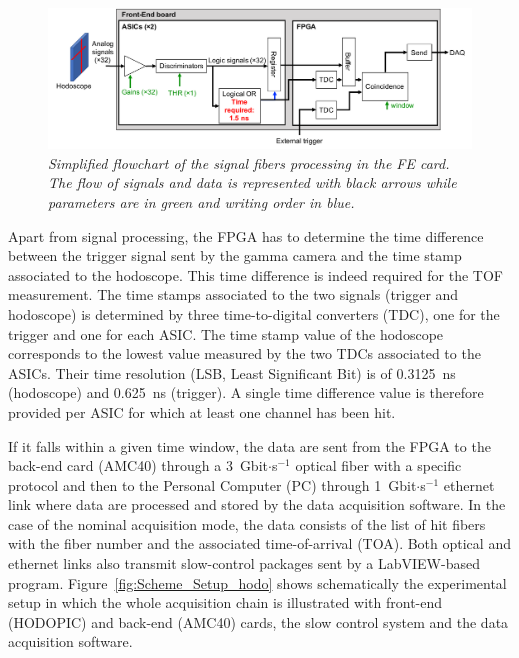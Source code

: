 \documentclass[a4paper,11pt]{article}
\begin{document}
\begin{figure}[htb]
\centering
\includegraphics[width=\textwidth]{figures/Hodoscope_reading_scheme.pdf}
\caption{\small{\textit{Simplified flowchart of the signal fibers processing in the FE card. The flow of signals and data is represented with black arrows while parameters are in green and writing order in blue.}}}
\label{fig:Scheme_reading_hodo}
\end{figure} 

Apart from signal processing, the FPGA has to determine the time difference between the trigger signal sent by the gamma camera and the time stamp associated to the hodoscope. This time difference is indeed required for the TOF measurement. The time stamps associated to the two signals (trigger and hodoscope) is determined by three time-to-digital converters (TDC), one for the trigger and one for each ASIC. The time stamp value of the hodoscope corresponds to the lowest value measured by the two TDCs associated to the ASICs. Their time resolution (LSB, Least Significant Bit) is of 0.3125~ns (hodoscope) and 0.625~ns (trigger). A single time difference value is therefore provided per ASIC for which at least one channel has been hit.

If it falls within a given time window, the data are sent from the FPGA to the back-end card (AMC40) \cite{Cachemiche2010} through a 3~Gbit$\cdot$s$^{-1}$ optical fiber with a specific protocol \cite{deng2013, Chen2017, Chen2019, Caplan2019} and then to the Personal Computer (PC) through 1~Gbit$\cdot$s$^{-1}$ ethernet link where data are processed and stored by the data acquisition software. In the case of the nominal acquisition mode, the data consists of the list of hit fibers with the fiber number and the associated time-of-arrival (TOA). Both optical and ethernet links also transmit slow-control packages sent by a LabVIEW-based program. Figure~\ref{fig:Scheme_Setup_hodo} shows schematically the experimental setup in which the whole acquisition chain is illustrated with front-end (HODOPIC) and back-end (AMC40) cards, the slow control system  and the data acquisition software.
\end{document}
